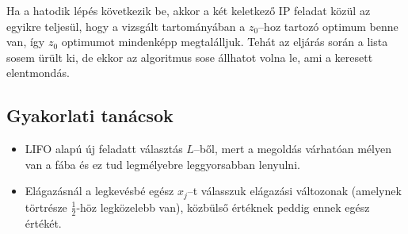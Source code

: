 Ha a hatodik lépés következik be, akkor a két keletkező IP feladat közül az
egyikre teljesül, hogy a vizsgált tartományában a $z_0$--hoz tartozó optimum
benne van, így $z_0$ optimumot mindenképp megtalálljuk. Tehát az eljárás során a
lista sosem ürült ki, de ekkor az algoritmus sose állhatot volna le, ami a
keresett elentmondás.

\subsection{Gyakorlati tanácsok}
\begin{itemize}
  \item LIFO alapú új feladatt választás $L$--ből, mert a megoldás várhatóan
  mélyen van a fába és ez tud legmélyebre leggyorsabban lenyulni.
  \item Elágazásnál a legkevésbé egész $x_j$--t válasszuk elágazási változonak
  (amelynek törtrésze $\frac{1}{2}$-höz legközelebb van), közbülső értéknek
  peddig ennek egész értékét.
\end{itemize}